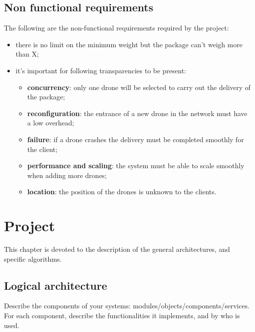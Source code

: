 \documentclass[a4paper, oneside]{memoir}
\begin{document}
\section{Non functional requirements}


The following are the non-functional requirements required by the project:
\begin{itemize}
\item there is no limit on the minimum weight but the package can't weigh more than X;
\item it's important for following transparencies to be present:
	\begin{itemize}
	\item \textbf{concurrency}: only one drone will be selected to carry out the delivery of the package;
	\item \textbf{reconfiguration}: the entrance of a new drone in the network must have a low overhead;
	\item \textbf{failure}: if a drone crashes the delivery must be completed smoothly for the client;
	\item \textbf{performance and scaling}: the system must be able to scale smoothly when adding more drones;
	\item \textbf{location}: the position of the drones is unknown to the clients.
	\end{itemize}
\end{itemize}


\chapter{Project}

This chapter is devoted to the description of the general architectures, and specific algorithms.

\section{Logical architecture}
Describe the components of your systems: modules/objects/components/services.
For each component, describe the functionalities it implements, and by who is used.
\end{document}
